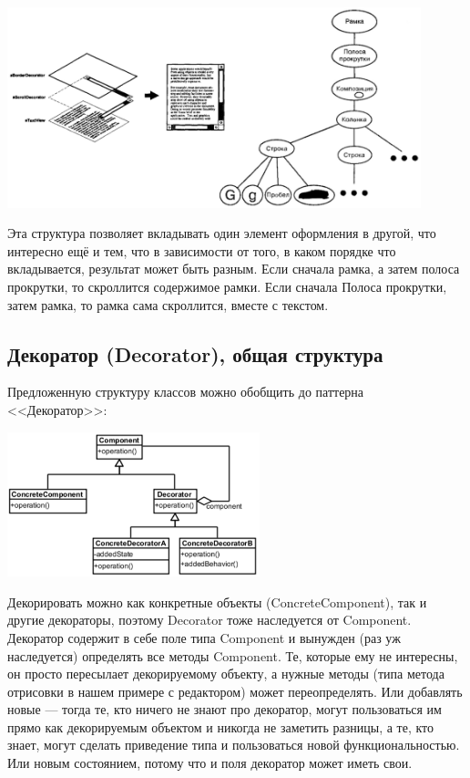 \documentclass{../text-style}
\begin{document}
\begin{center}
    \includegraphics[width=0.9\textwidth]{glyphStructure.png}
\end{center}

Эта структура позволяет вкладывать один элемент оформления в другой, что интересно ещё и тем, что в зависимости от того, в каком порядке что вкладывается, результат может быть разным. Если сначала рамка, а затем полоса прокрутки, то скроллится содержимое рамки. Если сначала Полоса прокрутки, затем рамка, то рамка сама скроллится, вместе с текстом.

\subsection{Декоратор (Decorator), общая структура}

Предложенную структуру классов можно обобщить до паттерна <<Декоратор>>:

\begin{center}
    \includegraphics[width=0.55\textwidth]{decorator.png}
\end{center}

Декорировать можно как конкретные объекты (ConcreteComponent), так и другие декораторы, поэтому Decorator тоже наследуется от Component. Декоратор содержит в себе поле типа Component и вынужден (раз уж наследуется) определять все методы Component. Те, которые ему не интересны, он просто пересылает декорируемому объекту, а нужные методы (типа метода отрисовки в нашем примере с редактором) может переопределять. Или добавлять новые --- тогда те, кто ничего не знают про декоратор, могут пользоваться им прямо как декорируемым объектом и никогда не заметить разницы, а те, кто знает, могут сделать приведение типа и пользоваться новой функциональностью. Или новым состоянием, потому что и поля декоратор может иметь свои.
\end{document}
